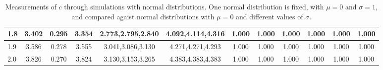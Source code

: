 \begin{table*}[h!]
\begin{center}
\begin{tabular}{| l | c | c | c | c | c | c | c | c | c | c | c |}
1.8 & 3.402 & 0.295 & 3.354 & 2.773,2.795,2.840 & 4.092,4.114,4.316  & 1.000  & 1.000  & 1.000  & 1.000  & 1.000  & 1.000 \\\hline
1.9 & 3.586 & 0.278 & 3.555 & 3.041,3.086,3.130 & 4.271,4.271,4.293  & 1.000  & 1.000  & 1.000  & 1.000  & 1.000  & 1.000 \\\hline
2.0 & 3.826 & 0.270 & 3.824 & 3.130,3.153,3.265 & 4.383,4.383,4.383  & 1.000  & 1.000  & 1.000  & 1.000  & 1.000  & 1.000 \\\hline
\end{tabular}
\caption{Measurements of $c$ through simulations
with normal distributions.
One normal distribution is fixed, with $\mu=0$ and $\sigma=1$,
and compared agaist normal distributions with $\mu=0$
and different values of $\sigma$.}
\end{center}
\end{table*}